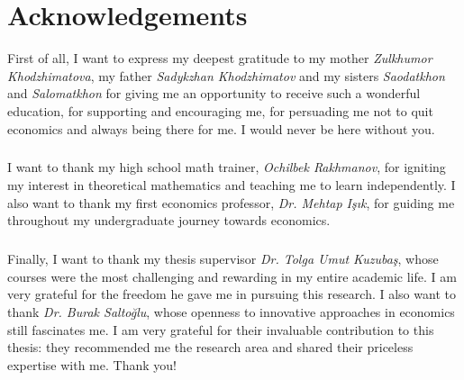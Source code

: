 \chapter*{Acknowledgements}
First of all, I want to express my deepest gratitude to my mother \textit{Zulkhumor Khodzhimatova}, my father \textit{Sadykzhan Khodzhimatov} and my sisters \textit{Saodatkhon} and \textit{Salomatkhon} for giving me an opportunity to receive such a wonderful education, for supporting and encouraging me, for persuading me not to quit economics and always being there for me. I would never be here without you.
\paragraph*{}I want to thank my high school math trainer, \textit{Ochilbek Rakhmanov}, for igniting my interest in theoretical mathematics and teaching me to learn independently. I also want to thank my first economics professor, \textit{Dr. Mehtap Işık}, for guiding me throughout my undergraduate journey towards economics.
\paragraph*{}Finally, I want to thank my thesis supervisor \textit{Dr. Tolga Umut Kuzubaş}, whose courses were the most challenging and rewarding in my entire academic life. I am very grateful for the freedom he gave me in pursuing this research. I also want to thank \textit{Dr. Burak Saltoğlu}, whose openness to innovative approaches in economics still fascinates me. I am very grateful for their invaluable contribution to this thesis: they recommended me the research area and shared their priceless expertise with me. Thank you!
